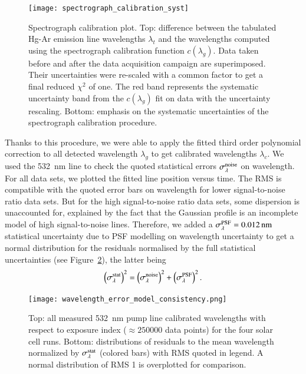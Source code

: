 \begin{figure}[!h]
\centering
\texttt{[image: spectrograph\_calibration\_syst]}
\caption{Spectrograph calibration plot. Top: difference between the tabulated Hg-Ar emission line wavelengths $\lambda_t$ and the wavelengths computed using the spectrograph calibration function $c(\lambda_g)$. Data taken before and after the data acquisition campaign are superimposed. Their uncertainties were re-scaled with a common factor to get a final reduced $\chi^2$ of one. The red band represents the systematic uncertainty band from the $c(\lambda_g)$ fit on data with the uncertainty rescaling. Bottom: emphasis on the systematic uncertainties of the spectrograph calibration procedure.}\label{fig:spectro_calib_syst}
\end{figure}

 


Thanks to this procedure, we were able to apply the fitted third order polynomial correction to all detected wavelength $\lambda_g$ to get calibrated wavelengths $\lambda_c$. We used the \SI{532}{\nm} line to check the quoted statistical errors $\sigma_\lambda^{\rm noise}$ on wavelength. For all data sets, we plotted the fitted line position versus time. The RMS is compatible with the quoted error bars on wavelength for lower signal-to-noise ratio data sets. But for the high signal-to-noise ratio data sets, some dispersion is unaccounted for, explained by the fact that the Gaussian profile is an incomplete model of high signal-to-noise lines. Therefore, we added a $\sigma_\lambda^{\rm PSF}=\SI{0.012}{\nm}$ statistical uncertainty due to PSF modelling on wavelength uncertainty to get a normal distribution for the residuals normalised by the full statistical uncertainties (see Figure~\ref{fig:wavelength_error_model_consistency}), the latter being
\begin{equation}
    \left(\sigma_{\lambda}^{\rm stat}\right)^2 =  \left(\sigma_{\lambda}^{\rm noise}\right)^2 +  \left(\sigma_{\lambda}^{\rm PSF}\right)^2.
\end{equation}

\begin{figure}[!h]
\centering
\texttt{[image: wavelength\_error\_model\_consistency.png]}
\caption{Top: all measured \SI{532}{\nm} pump line calibrated wavelengths with respect to exposure index ($\approx\num{250000}$ data points) for the four solar cell runs. Bottom: distributions of residuals to the mean wavelength normalized by $\sigma_{\lambda}^{\rm stat}$ (colored bars) with RMS quoted in legend. A normal distribution of RMS 1 is overplotted for comparison.}\label{fig:wavelength_error_model_consistency}
\end{figure}

